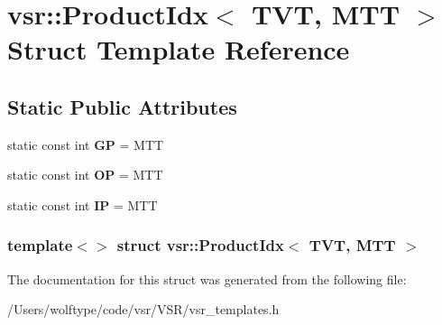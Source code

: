 \hypertarget{structvsr_1_1_product_idx_3_01_t_v_t_00_01_m_t_t_01_4}{\section{vsr\-:\-:Product\-Idx$<$ T\-V\-T, M\-T\-T $>$ Struct Template Reference}
\label{structvsr_1_1_product_idx_3_01_t_v_t_00_01_m_t_t_01_4}
}
\subsection*{Static Public Attributes}
\begin{DoxyCompactItemize}
\item 
\hypertarget{structvsr_1_1_product_idx_3_01_t_v_t_00_01_m_t_t_01_4_a672b8abd21b11cd36850c441b5273e69}{static const int {\bfseries G\-P} = M\-T\-T}\label{structvsr_1_1_product_idx_3_01_t_v_t_00_01_m_t_t_01_4_a672b8abd21b11cd36850c441b5273e69}

\item 
\hypertarget{structvsr_1_1_product_idx_3_01_t_v_t_00_01_m_t_t_01_4_a32f3b1026f1a96089385cc863aba4801}{static const int {\bfseries O\-P} = M\-T\-T}\label{structvsr_1_1_product_idx_3_01_t_v_t_00_01_m_t_t_01_4_a32f3b1026f1a96089385cc863aba4801}

\item 
\hypertarget{structvsr_1_1_product_idx_3_01_t_v_t_00_01_m_t_t_01_4_a6064d47cb942a6be7408f5de89d21885}{static const int {\bfseries I\-P} = M\-T\-T}\label{structvsr_1_1_product_idx_3_01_t_v_t_00_01_m_t_t_01_4_a6064d47cb942a6be7408f5de89d21885}

\end{DoxyCompactItemize}
\subsubsection*{template$<$$>$ struct vsr\-::\-Product\-Idx$<$ T\-V\-T, M\-T\-T $>$}



The documentation for this struct was generated from the following file\-:\begin{DoxyCompactItemize}
\item 
/\-Users/wolftype/code/vsr/\-V\-S\-R/vsr\-\_\-templates.\-h\end{DoxyCompactItemize}
